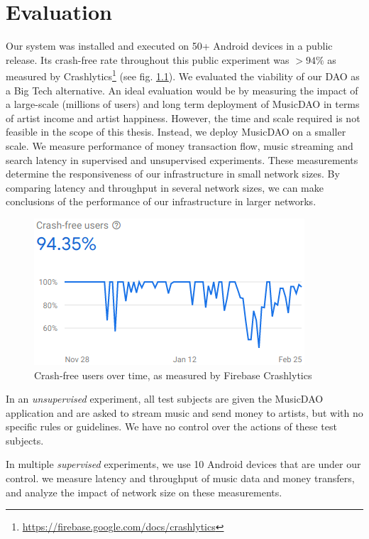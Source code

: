 \chapter{\label{chap:evaluation}Evaluation}
Our system was installed and executed on 50+ Android devices in a public release. Its crash-free rate throughout this public experiment was $>94\%$ as measured by Crashlytics\footnote{\url{https://firebase.google.com/docs/crashlytics}} (see fig. \ref{fig:crash-free-users}). We evaluated the viability of our DAO as a Big Tech alternative. An ideal evaluation would be by measuring the impact of a large-scale (millions of users) and long term deployment of MusicDAO in terms of artist income and artist happiness. However, the time and scale required is not feasible in the scope of this thesis. Instead, we deploy MusicDAO on a smaller scale. We measure performance of money transaction flow, music streaming and search latency in supervised and unsupervised experiments. These measurements determine the responsiveness of our infrastructure in small network sizes. By comparing latency and throughput in several network sizes, we can make conclusions of the performance of our infrastructure in larger networks.

\begin{figure}
    \centering
    \includegraphics[width=0.4\linewidth]{evaluation/crash-free-users-90-days.png}
    \caption{Crash-free users over time, as measured by Firebase Crashlytics}
    \label{fig:crash-free-users}
\end{figure}
In an \textit{unsupervised} experiment, all test subjects are given the MusicDAO application and are asked to stream music and send money to artists, but with no specific rules or guidelines. We have no control over the actions of these test subjects.

In multiple \textit{supervised} experiments, we use 10 Android devices that are under our control. we measure latency and throughput of music data and money transfers, and analyze the impact of network size on these measurements.


